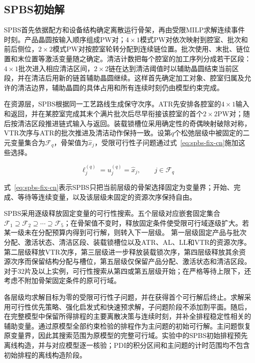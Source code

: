 \documentclass[journal]{IEEEtran}
\begin{document}
\subsection{SPBS初始解}

SPBS首先依据配方和设备结构确定离散运行骨架，再由受限MILP求解连续事件时刻。产品晶圆按输入顺序组成PW对；$4\times1$模式PW对依次映射到腔室、批次和前后侧位，$2\times2$模式PW对按腔室轮转分配到连续链位置。批次使用、末批、链位置和末位置等激活变量随之确定。清洁计数把每个腔室的加工序列分成若干区段：$4\times1$批次进入相应清洁区间，$2\times2$链在达到清洁阈值时以辅助晶圆结束当前区段，并在清洁后用新的链首辅助晶圆继续。这样首先确定加工对象、腔室归属及允许的清洁边界，辅助晶圆的具体占用和所有连续时刻仍由模型约束完成。

在资源层，SPBS根据同一工艺路线生成保守次序。ATR先安排各腔室的$4\times1$输入和返回，并在某腔室完成其末个满片批次后尽早衔接该腔室的首个$2\times2$PW对；随后按清洁区段推进链式输入与返回。装载锁槽位采用确定性的奇偶映射破除对称，VTR次序与ATR的批次推进及清洁动作保持一致。设第$q$个松弛层级中被固定的二元变量集合为$\mathcal F_q$，骨架值为$\widehat x_j$，受限可行性子问题通过式~\eqref{eq:spbs-fix-cn}施加这些选择。

\begin{equation}
\ell_j^{(q)}=u_j^{(q)}=\widehat x_j,\qquad j\in\mathcal F_q
\label{eq:spbs-fix-cn}
\end{equation}

式~\eqref{eq:spbs-fix-cn}表示SPBS只把当前层级的骨架选择固定为变量界；开始、完成、等待等连续变量，以及该层级未固定的资源次序保持自由。

SPBS采用逐级释放固定变量的可行性搜索。五个层级对应嵌套固定集合$\mathcal F_1\supseteq\mathcal F_2\supseteq\cdots\supseteq\mathcal F_5$；在骨架值不变时，释放固定条件使受限可行域逐级扩大。若某一级未在分配预算内得到可行解，则转入下一层级。
第一层级固定产品与批次分配、激活状态、清洁区段、装载锁槽位以及ATR、AL、LL和VTR的资源次序。第二层级释放VTR次序，第三层级进一步释放装载锁次序，第四层级释放其余资源次序而保留结构分配与槽位，第五层级仅保留产品分配、激活状态和清洁区段。对于32片及以上实例，可行性搜索从第四或第五层级开始；在严格等待上限下，还考虑不附加骨架固定条件的原可行域。

各层级均求解目标为零的受限可行性子问题，并在获得首个可行解后终止。求解采用可行性优先策略、强化启发式和快速预求解，子问题阶段不添加割平面。随后，在完整模型中保留所得排程的主要离散决策与连续时刻，并补全排程稳定性相关的辅助变量。通过原模型全部约束检验的排程作为主问题的初始可行解。主问题恢复原变量界，因此其搜索范围为原模型的完整可行域。实验中的SPBS初始排程预先离线构造，并与对应模型逐一核验；PDI的积分区间和主问题的计时范围均不包含初始排程的离线构造阶段。
\end{document}
